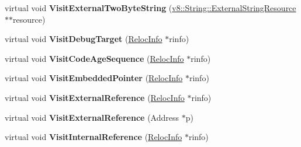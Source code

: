 \begin{DoxyCompactItemize}
\item 
virtual void {\bfseries Visit\+External\+Two\+Byte\+String} (\hyperlink{classv8_1_1_string_1_1_external_string_resource}{v8\+::\+String\+::\+External\+String\+Resource} $\ast$$\ast$resource)\hypertarget{classv8_1_1internal_1_1_b_a_s_e___e_m_b_e_d_d_e_d_a5f1bee8575ed445ac250f154ca6971d8}{}\label{classv8_1_1internal_1_1_b_a_s_e___e_m_b_e_d_d_e_d_a5f1bee8575ed445ac250f154ca6971d8}

\item 
virtual void {\bfseries Visit\+Debug\+Target} (\hyperlink{classv8_1_1internal_1_1_reloc_info}{Reloc\+Info} $\ast$rinfo)\hypertarget{classv8_1_1internal_1_1_b_a_s_e___e_m_b_e_d_d_e_d_a8ef2cbc99ef4d169dc6263e9221da6f1}{}\label{classv8_1_1internal_1_1_b_a_s_e___e_m_b_e_d_d_e_d_a8ef2cbc99ef4d169dc6263e9221da6f1}

\item 
virtual void {\bfseries Visit\+Code\+Age\+Sequence} (\hyperlink{classv8_1_1internal_1_1_reloc_info}{Reloc\+Info} $\ast$rinfo)\hypertarget{classv8_1_1internal_1_1_b_a_s_e___e_m_b_e_d_d_e_d_a97c801915b96b54e985475f118401286}{}\label{classv8_1_1internal_1_1_b_a_s_e___e_m_b_e_d_d_e_d_a97c801915b96b54e985475f118401286}

\item 
virtual void {\bfseries Visit\+Embedded\+Pointer} (\hyperlink{classv8_1_1internal_1_1_reloc_info}{Reloc\+Info} $\ast$rinfo)\hypertarget{classv8_1_1internal_1_1_b_a_s_e___e_m_b_e_d_d_e_d_a6e03ad2e073624f35aca71c1663f20e8}{}\label{classv8_1_1internal_1_1_b_a_s_e___e_m_b_e_d_d_e_d_a6e03ad2e073624f35aca71c1663f20e8}

\item 
virtual void {\bfseries Visit\+External\+Reference} (\hyperlink{classv8_1_1internal_1_1_reloc_info}{Reloc\+Info} $\ast$rinfo)\hypertarget{classv8_1_1internal_1_1_b_a_s_e___e_m_b_e_d_d_e_d_a458b49716b80d32d92d8841a6aa1992b}{}\label{classv8_1_1internal_1_1_b_a_s_e___e_m_b_e_d_d_e_d_a458b49716b80d32d92d8841a6aa1992b}

\item 
virtual void {\bfseries Visit\+External\+Reference} (Address $\ast$p)\hypertarget{classv8_1_1internal_1_1_b_a_s_e___e_m_b_e_d_d_e_d_ad4ea82dd122e2edce635b4a0917480b1}{}\label{classv8_1_1internal_1_1_b_a_s_e___e_m_b_e_d_d_e_d_ad4ea82dd122e2edce635b4a0917480b1}

\item 
virtual void {\bfseries Visit\+Internal\+Reference} (\hyperlink{classv8_1_1internal_1_1_reloc_info}{Reloc\+Info} $\ast$rinfo)\hypertarget{classv8_1_1internal_1_1_b_a_s_e___e_m_b_e_d_d_e_d_a1640b52b736e8089811ae80525194e95}{}\label{classv8_1_1internal_1_1_b_a_s_e___e_m_b_e_d_d_e_d_a1640b52b736e8089811ae80525194e95}


\end{DoxyCompactItemize}
